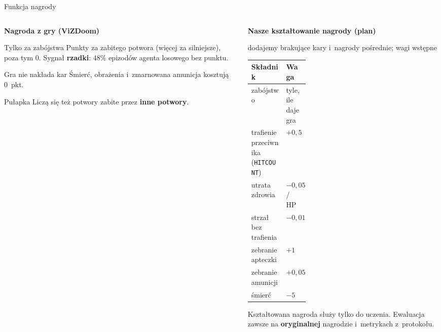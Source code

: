 \documentclass[aspectratio=169,10pt]{beamer}
\newcommand{\slidenum}{}
\begin{document}
\renewcommand{\slidenum}{02}
\begin{frame}{Funkcja nagrody}
  \begin{columns}[T,onlytextwidth]
    \begin{column}{0.47\textwidth}
      {\small\textbf{Nagroda z gry (ViZDoom)}\par}
      \vspace{2mm}
      \begin{infocard}{\faPlusCircle}{Tylko za zabójstwa}
        Punkty za zabitego potwora (więcej za silniejsze), poza tym 0.
        Sygnał \textbf{rzadki}: 48\% epizodów agenta losowego bez punktu.
      \end{infocard}
      \begin{infocard}{\faMinusCircle}{Gra nie nakłada kar}
        Śmierć, obrażenia i~zmarnowana amunicja kosztują 0~pkt.
      \end{infocard}
      \begin{infocard}{\faExclamationTriangle}{Pułapka}
        Liczą się też potwory zabite przez \textbf{inne potwory}.
      \end{infocard}
    \end{column}
    \begin{column}{0.49\textwidth}
      {\small\textbf{Nasze kształtowanie nagrody (plan)}\par}
      {\scriptsize\color{muted}dodajemy brakujące kary i~nagrody pośrednie; wagi wstępne\par}
      \vspace{2mm}
      \footnotesize
      \renewcommand{\arraystretch}{1.35}
      \begin{tabular}{@{}l>{\raggedleft\arraybackslash}p{0.3\linewidth}@{}}
        \toprule
        \textbf{Składnik} & \textbf{Waga} \\
        \midrule
        zabójstwo & tyle, ile daje gra \\
        trafienie przeciwnika (\texttt{HITCOUNT}) & $+0{,}5$ \\
        utrata zdrowia & $-0{,}05$ / HP \\
        strzał bez trafienia & $-0{,}01$ \\
        zebranie apteczki & $+1$ \\
        zebranie amunicji & $+0{,}05$ \\
        śmierć & $-5$ \\
        \bottomrule
      \end{tabular}

      \vspace{3mm}
      {\scriptsize\color{muted}\faInfoCircle\hspace{1.5mm}Kształtowana nagroda służy tylko
      do uczenia. Ewaluacja zawsze na \textbf{oryginalnej} nagrodzie i~metrykach z~protokołu.\par}
    \end{column}
  \end{columns}
\end{frame}
\end{document}
